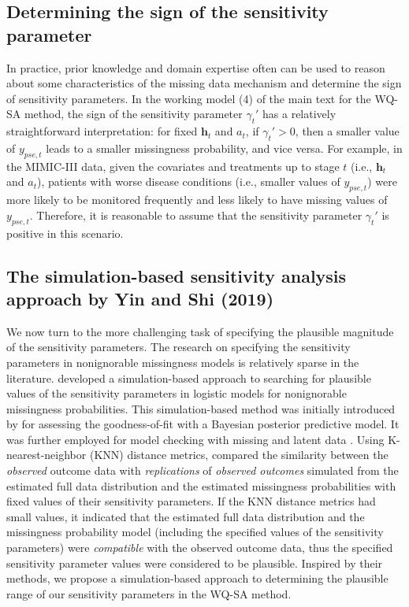 \documentclass[12pt]{article}
\begin{document}
\subsection{Determining the sign of the sensitivity parameter}

 In practice, prior knowledge and domain expertise often can  be used to reason about some  characteristics of the missing data mechanism and determine the sign of   sensitivity parameters. In the working model (4) of the main text for the WQ-SA method, the sign of the sensitivity parameter $\gamma_t'$ has a relatively straightforward interpretation: for fixed $\bm{h}_t$ and $a_t$, if $\gamma_t' >0$, then a smaller value of $y_{pse,t}$ leads to a smaller missingness probability, and vice versa. For example, in the MIMIC-III data, given the covariates and treatments up to stage $t$ (i.e., $\bm{h}_t$ and $a_t$), patients with worse disease conditions (i.e., smaller values of $y_{pse,t}$) were more likely to be monitored frequently and  less likely to have missing values of $y_{pse,t}$. Therefore, it is reasonable to assume that the sensitivity parameter $\gamma_t'$ is positive in this scenario.    


\subsection{The simulation-based sensitivity analysis approach by Yin and Shi (2019)}
We now turn to the more challenging task of specifying the plausible magnitude of the sensitivity parameters. The research on specifying the sensitivity parameters in nonignorable missingness models   is relatively sparse in the literature. \cite{yin2019simulation} developed a simulation-based  approach to searching for plausible values of the sensitivity parameters in  logistic models for nonignorable missingness probabilities. This simulation-based method was initially introduced by \cite{gelman1996posterior} for assessing the goodness-of-fit with a Bayesian posterior predictive model. It was further employed for model checking with missing and latent data \citep{gelman2005multiple,copas2000meta,copas2005local,daniels2012bayesian}. 
Using K-nearest-neighbor (KNN) distance metrics, \cite{yin2019simulation} compared the similarity between the \textit{observed} outcome  data with \textit{{replications}} of \textit{{observed outcomes}} simulated from the estimated full data distribution and the estimated  missingness probabilities with fixed values of their sensitivity parameters. If the KNN distance metrics had small values, it indicated that the estimated full data distribution and the missingness probability model (including the specified values of the sensitivity parameters) were \textit{compatible} with the observed outcome data, thus the specified sensitivity parameter values were considered to be plausible.  
Inspired by their methods, we propose a simulation-based approach to determining the plausible range of our sensitivity parameters in the WQ-SA method.
\end{document}
